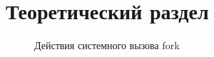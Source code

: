 \chapter{Теоретический раздел}

	\begin{figure}[htb!]
		\caption{Действия системного вызова fork}
		\label{img:fork.jpg}
	\end{figure}
	
